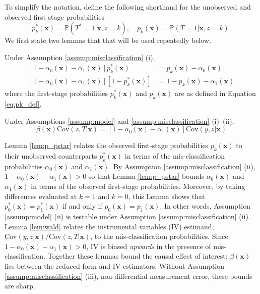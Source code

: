 To simplify the notation, define the following shorthand for the unobserved and observed first stage probabilities
\begin{equation}
  p^*_k(\mathbf{x}) = \mathbb{P}(T^*=1|\mathbf{x},z=k), \quad
  p_k(\mathbf{x}) = \mathbb{P}(T=1|\mathbf{x},z=k).
  \label{eq:pk_def}
\end{equation}
We first state two lemmas that that will be used repeatedly below.
\begin{lem}
\label{lem:p_pstar}
  Under Assumption \ref{assump:misclassification} (i),
\begin{align*}
  \left[ 1 - \alpha_0(\mathbf{x}) - \alpha_1(\mathbf{x}) \right]p^*_k(\mathbf{x}) &= p_k(\mathbf{x}) - \alpha_0(\mathbf{x})\\
  \left[ 1 - \alpha_0(\mathbf{x}) - \alpha_1(\mathbf{x}) \right]\left[1 - p^*_k(\mathbf{x}) \right]&= 1 - p_k(\mathbf{x}) - \alpha_1(\mathbf{x})
\end{align*}
where the first-stage probabilities $p_k^*(\mathbf{x})$ and $p_k(\mathbf{x})$ are as defined in Equation \ref{eq:pk_def}.
\end{lem} 

\begin{lem}
  \label{lem:wald}
  Under Assumptions \ref{assump:model} and \ref{assump:misclassification} (i)--(ii), $$\beta(\mathbf{x}) \mbox{Cov}(z,T|\mathbf{x}) = \left[ 1 - \alpha_0(\mathbf{x}) - \alpha_1(\mathbf{x}) \right]\mbox{Cov}(y,z|\mathbf{x})$$
\end{lem}

Lemma \ref{lem:p_pstar} relates the observed first-stage probabilities $p_k(\mathbf{x})$ to their unobserved counterparts $p^*_k(\mathbf{x})$ in terms of the mis-classification probabilities $\alpha_0(\mathbf{x})$ and $\alpha_1(\mathbf{x})$.
By Assumption \ref{assump:misclassification} (ii), $1 - \alpha_0(\mathbf{x}) - \alpha_1(\mathbf{x}) > 0$ so that Lemma \ref{lem:p_pstar} bounds $\alpha_0(\mathbf{x})$ and $\alpha_1(\mathbf{x})$ in terms of the observed first-stage probabilities.
Moreover, by taking differences evaluated at $k=1$ and $k=0$, this Lemma shows that $p_0^*(\mathbf{x}) = p_1^*(\mathbf{x})$ if and only if $p_0(\mathbf{x})=p_1(\mathbf{x})$.
In other words, Assumption \ref{assump:model} (ii) is testable under Assumption \ref{assump:misclassification} (ii).
Lemma \ref{lem:wald} relates the instrumental variables (IV) estimand, $\mbox{Cov}(y,z|\mathbf{x})/\mbox{Cov}(z,T|\mathbf{x})$, to the mis-classification probabilities.
Since $1 - \alpha_0(\mathbf{x}) - \alpha_1(\mathbf{x}) > 0$, IV is biased \emph{upwards} in the presence of mis-classification.
Together these lemmas bound the causal effect of interest: $\beta(\mathbf{x})$ lies between the reduced form and IV estimators.
Without Assumption \ref{assump:misclassification} (iii), non-differential measurement error, these bounds are sharp.

